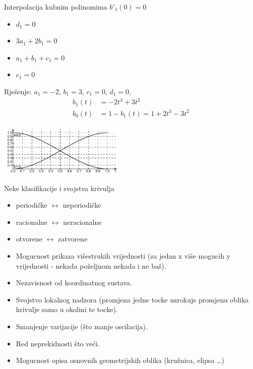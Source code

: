\documentclass[9pt]{beamer}
\begin{document}
\begin{frame}{Interpolacija kubnim polinomima}
	$b'_1(0)=0$ \\
	\begin{itemize}
		\item $d_1=0$
		\item $3a_1+2b_1 = 0$
		\item $a_1+b_1 + c_1 = 0$
		\item $c_1=0$
	\end{itemize}
	Rješenje: $a_1=-2$, $b_1=3$, $c_1=0$, $d_1=0$,
	\begin{align*}
		b_1(t) &= -2t^3 + 3t^2 \\
		b_0(t) &= 1-b_1(t) = 1+2t^3 - 3t^2
	\end{align*}
\begin{center}
	\includegraphics[height=2.5cm]{./slike/lin_interp_der_eq_0.png}
\end{center}
\end{frame}

\begin{frame}{Neke klasifikacije  i svojstva krivulja}
	\begin{itemize}
		\item periodičke $\leftrightarrow$ neperiodičke
		\item racionalne $\leftrightarrow$ neracionalne
		\item otvorene $\leftrightarrow$ zatvorene
	\end{itemize}
	\begin{itemize}
		\item Mogucnost prikaza višestrukih vrijednosti (za jedan x više mogucih y vrijednosti - nekada poželjnom nekada i ne baš).
		\item Nezavisnost od koordinatnog sustava.
		\item Svojstvo lokalnog nadzora (promjena jedne tocke uzrokuje promjenu oblika krivulje samo u 	okolini te tocke).
		\item Smanjenje varijacije (što manje oscilacija).
		\item Red neprekidnosti što veći.
		\item Mogucnost opisa osnovnih geometrijskih oblika (kružnica, elipsa \ldots )
	\end{itemize}	
\end{frame}	
\end{document}
